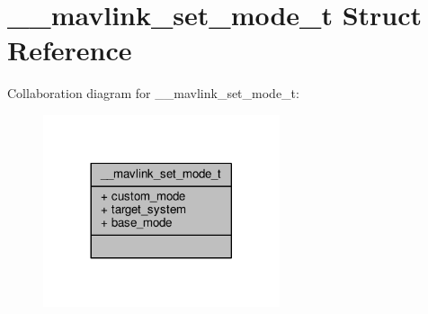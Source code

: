 \hypertarget{struct____mavlink__set__mode__t}{\section{\+\_\+\+\_\+mavlink\+\_\+set\+\_\+mode\+\_\+t Struct Reference}
\label{struct____mavlink__set__mode__t}
}


Collaboration diagram for \+\_\+\+\_\+mavlink\+\_\+set\+\_\+mode\+\_\+t\+:
\nopagebreak
\begin{figure}[H]
\begin{center}
\leavevmode
\includegraphics[width=197pt]{struct____mavlink__set__mode__t__coll__graph}
\end{center}
\end{figure}
